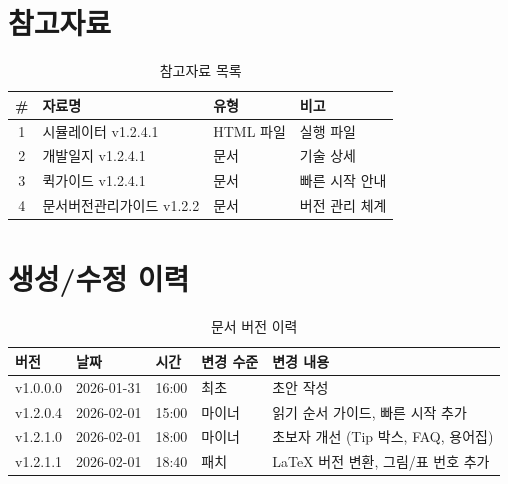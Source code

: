 \documentclass[11pt,a4paper]{article}
\begin{document}
\section{참고자료}

\begin{table}[H]
\centering
\caption{참고자료 목록}
\label{tab:references}
\begin{tabularx}{\textwidth}{c|l|l|X}
\toprule
\textbf{\#} & \textbf{자료명} & \textbf{유형} & \textbf{비고} \\
\midrule
1 & 시뮬레이터 v1.2.4.1 & HTML 파일 & 실행 파일 \\
2 & 개발일지 v1.2.4.1 & 문서 & 기술 상세 \\
3 & 퀵가이드 v1.2.4.1 & 문서 & 빠른 시작 안내 \\
4 & 문서버전관리가이드 v1.2.2 & 문서 & 버전 관리 체계 \\
\bottomrule
\end{tabularx}
\end{table}

\section{생성/수정 이력}

\begin{table}[H]
\centering
\caption{문서 버전 이력}
\label{tab:version_history}
\begin{tabularx}{\textwidth}{l|l|l|l|X}
\toprule
\textbf{버전} & \textbf{날짜} & \textbf{시간} & \textbf{변경 수준} & \textbf{변경 내용} \\
\midrule
v1.0.0.0 & 2026-01-31 & 16:00 & 최초 & 초안 작성 \\
v1.2.0.4 & 2026-02-01 & 15:00 & 마이너 & 읽기 순서 가이드, 빠른 시작 추가 \\
v1.2.1.0 & 2026-02-01 & 18:00 & 마이너 & 초보자 개선 (Tip 박스, FAQ, 용어집) \\
v1.2.1.1 & 2026-02-01 & 18:40 & 패치 & LaTeX 버전 변환, 그림/표 번호 추가 \\
\bottomrule
\end{tabularx}
\end{table}
\end{document}

